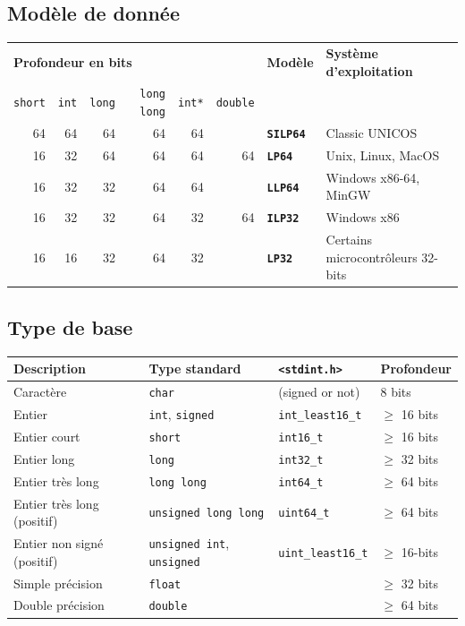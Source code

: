 \documentclass{article}
\newcommand{\cd}{\lstinline}
\begin{document}
\begin{multicols*}{3}
\subsection*{Modèle de donnée}
\begin{tabularx}{\linewidth}{r|r|r|r|r|r|l|X}
  \multicolumn{6}{l|}{\bf Profondeur en bits} & \bf Modèle & \bf Système d'exploitation \\
  \cd {short} & \cd{int} & \cd{long} & \cd{long long} & \cd{int*} & \cd{double} & & \\
  \hline
  64 & 64 & 64 & 64 & 64 & & \bf \tt SILP64 & Classic UNICOS\\
  16 & 32 & 64 & 64 & 64 & 64 & \bf \tt LP64   & Unix, Linux, MacOS \\
  16 & 32 & 32 & 64 & 64 & & \bf \tt LLP64  & Windows x86-64, MinGW \\
  16 & 32 & 32 & 64 & 32 & 64 & \bf \tt ILP32  & Windows x86 \\
  16 & 16 & 32 & 64 & 32 & & \bf \tt LP32   & Certains microcontrôleurs 32-bits\\
\end{tabularx}

\subsection*{Type de base}
\begin{tabularx}{\linewidth}{X|l|l|l}
  \bf Description & \bf Type standard & \bf \texttt{<stdint.h>} & \bf Profondeur \\
  \hline
  Caractère                   & \cd{char}      & (signed or not) & 8 bits \\
  \hline
  Entier                      & \cd{int}, \cd{signed}  & \cd {int_least16_t} & $\geq$ 16 bits \\
  Entier court                & \cd{short}     & \cd {int16_t} & $\geq$ 16 bits \\
  Entier long                 & \cd{long}      & \cd {int32_t} & $\geq$ 32 bits \\
  Entier très long            & \cd{long long} & \cd {int64_t} & $\geq$ 64 bits \\
  Entier très long (positif)  & \cd{unsigned long long} & \cd {uint64_t} & $\geq$ 64 bits \\
  Entier non signé (positif)  & \cd{unsigned int}, \cd{unsigned} & \cd{uint_least16_t} & $\geq$ 16-bits \\
  \hline
  Simple précision            & \cd{float}     &  & $\geq$ 32 bits \\
  Double précision            & \cd{double}    &  & $\geq$ 64 bits \\
\end{tabularx}


\end{multicols*}
\end{document}
